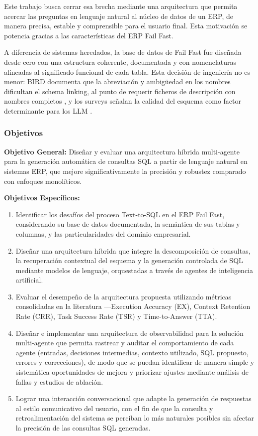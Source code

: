 \documentclass[journal]{IEEEtran}
\begin{document}
Este trabajo busca cerrar esa brecha mediante una arquitectura que permita acercar las preguntas en lenguaje natural al núcleo de datos de un ERP, de manera precisa, estable y comprensible para el usuario final. Esta motivación se potencia gracias a las características del ERP Fail Fast.

A diferencia de sistemas heredados, la base de datos de Fail Fast fue diseñada desde cero con una estructura coherente, documentada y con nomenclaturas alineadas al significado funcional de cada tabla. Esta decisión de ingeniería no es menor: BIRD documenta que la abreviación y ambigüedad en los nombres dificultan el schema linking, al punto de requerir ficheros de descripción con nombres completos \cite{hong2024bird}, y los surveys señalan la calidad del esquema como factor determinante para los LLM \cite{shi2025comprehensive, hong2025advances}.

\subsubsection{Objetivos}

\textbf{Objetivo General:}
Diseñar y evaluar una arquitectura híbrida multi-agente para la generación automática de consultas SQL a partir de lenguaje natural en sistemas ERP, que mejore significativamente la precisión y robustez comparado con enfoques monolíticos.

\textbf{Objetivos Específicos:}
\begin{enumerate}
	\item Identificar los desafíos del proceso Text-to-SQL en el ERP Fail Fast, considerando su base de datos documentada, la semántica de sus tablas y columnas, y las particularidades del dominio empresarial.

	\item Diseñar una arquitectura híbrida que integre la descomposición de consultas, la recuperación contextual del esquema y la generación controlada de SQL mediante modelos de lenguaje, orquestadas a través de agentes de inteligencia artificial.

	\item Evaluar el desempeño de la arquitectura propuesta utilizando métricas consolidadas en la literatura —Execution Accuracy (EX), Context Retention Rate (CRR), Task Success Rate (TSR) y Time-to-Answer (TTA).

	\item Diseñar e implementar una arquitectura de observabilidad para la solución multi-agente que permita rastrear y auditar el comportamiento de cada agente (entradas, decisiones intermedias, contexto utilizado, SQL propuesto, errores y correcciones), de modo que se puedan identificar de manera simple y sistemática oportunidades de mejora y priorizar ajustes mediante análisis de fallas y estudios de ablación.

	\item Lograr una  interacción conversacional que adapte la generación de respuestas  al estilo comunicativo del usuario, con el fin de que la consulta y retroalimentación del sistema se perciban lo más naturales posibles sin afectar la precisión de las consultas SQL generadas.
\end{enumerate}
\end{document}
